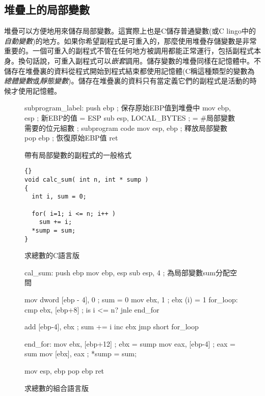 \subsection{堆疊上的局部變數}

堆疊可以方便地用來儲存局部變數。這實際上也是C儲存普通變數(或C
lingo中的\emph{自動變數})的地方。如果你希望副程式是可重入的，那麼使用堆疊存儲變數是非常重要的。一個可重入的副程式不管在任何地方被調用都能正常運行，包括副程式本身。換句話說，可重入副程式可以\emph{嵌套}調用。儲存變數的堆疊同樣在記憶體中。不儲存在堆疊裏的資料從程式開始到程式結束都使用記憶體(C稱這種類型的變數為
\emph{總體變數}或\emph{靜態變數})。儲存在堆疊裏的資料只有當定義它們的副程式是活動的時候才使用記憶體。

\begin{figure}[t]
\begin{AsmCodeListing}[frame=single]
subprogram_label:
      push   ebp                ; 保存原始EBP值到堆疊中
      mov    ebp, esp           ; 新EBP的值 = ESP
      sub    esp, LOCAL_BYTES   ; = #局部變數需要的位元組數
; subprogram code
      mov    esp, ebp           ; 釋放局部變數
      pop    ebp                ; 恢復原始EBP值
      ret
\end{AsmCodeListing}
\caption{帶有局部變數的副程式的一般格式\label{fig:subskel2}}
\end{figure}

\begin{figure}[t]
\begin{lstlisting}[frame=tlrb]{}
void calc_sum( int n, int * sump )
{
  int i, sum = 0;

  for( i=1; i <= n; i++ )
    sum += i;
  *sump = sum;
}
\end{lstlisting}
\caption{求總數的C語言版 \label{fig:Csum}}
\end{figure}

\begin{figure}[t]
\begin{AsmCodeListing}[frame=single]
cal_sum:
      push   ebp
      mov    ebp, esp
      sub    esp, 4               ; 為局部變數sum分配空間

      mov    dword [ebp - 4], 0   ; sum = 0
      mov    ebx, 1               ; ebx (i) = 1
for_loop:
      cmp    ebx, [ebp+8]         ; is i <= n?
      jnle   end_for

      add    [ebp-4], ebx         ; sum += i
      inc    ebx
      jmp    short for_loop

end_for:
      mov    ebx, [ebp+12]        ; ebx = sump
      mov    eax, [ebp-4]         ; eax = sum
      mov    [ebx], eax           ; *sump = sum;

      mov    esp, ebp
      pop    ebp
      ret
\end{AsmCodeListing}
\caption{求總數的組合語言版 \label{fig:Asmsum}}
\end{figure}

